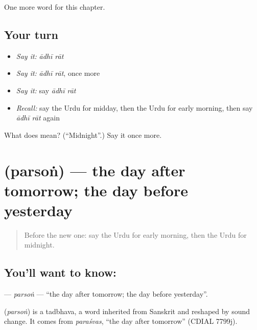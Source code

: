 \begin{grammarlens}[title={What you've built}]
One more word for this chapter.
\end{grammarlens}

\subsection*{Your turn}
\begin{itemize}
\raggedright
  \item \emph{Say it:} \emph{ādhī rāt}
  \item \emph{Say it:} \emph{ādhī rāt}, once more
  \item \emph{Say it:} say \emph{ādhī rāt}
  \item \emph{Recall:} say the Urdu for midday, then the Urdu for early morning, then say \emph{ādhī rāt} again
\end{itemize}

\begin{tcolorbox}[breakable,colback=teal!4,colframe=teal!35!black,title={Before you move on}]
What does   mean? (\textquotedblleft{}Midnight\textquotedblright{}.) Say it once more.
\end{tcolorbox}
\section[\texorpdfstring{\ur{پرسوں} (parsoṅ)}{پرسوں (parsoṅ)}]{ (parsoṅ) — the day after tomorrow; the day before yesterday}

\label{lesson:UR-C91-parson}



\begin{quote}
Before the new one: say the Urdu for early morning, then the Urdu for midnight.
\end{quote}

\subsection*{You'll want to know: }
\textbf{} — \emph{parsoṅ} — \textquotedblleft{}the day after tomorrow; the day before yesterday\textquotedblright{}.

\begin{cousinweb}
\textbf{} (\emph{parsoṅ}) is a tadbhava, a word inherited from Sanskrit and reshaped by sound change. It comes from \emph{paraśvas}, \textquotedblleft{}the day after tomorrow\textquotedblright{} (CDIAL 7799j).
\end{cousinweb}

